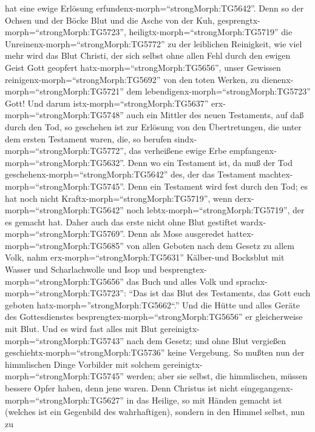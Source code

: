 hat eine ewige Erlösung erfundenx-morph=``strongMorph:TG5642''.
 Denn so der Ochsen und der Böcke Blut und die Asche von
der Kuh, gesprengtx-morph=``strongMorph:TG5723'',
heiligtx-morph=``strongMorph:TG5719'' die
Unreinenx-morph=``strongMorph:TG5772'' zu der leiblichen Reinigkeit,
 wie viel mehr wird das Blut Christi, der sich selbst ohne
allen Fehl durch den ewigen Geist Gott geopfert
hatx-morph=``strongMorph:TG5656'', unser Gewissen
reinigenx-morph=``strongMorph:TG5692'' von den toten Werken, zu
dienenx-morph=``strongMorph:TG5721'' dem
lebendigenx-morph=``strongMorph:TG5723'' Gott!  Und darum
istx-morph=``strongMorph:TG5637'' erx-morph=``strongMorph:TG5748'' auch
ein Mittler des neuen Testaments, auf daß durch den Tod, so geschehen
ist zur Erlösung von den Übertretungen, die unter dem ersten Testament
waren, die, so berufen sindx-morph=``strongMorph:TG5772'', das
verheißene ewige Erbe empfangenx-morph=``strongMorph:TG5632''.
 Denn wo ein Testament ist, da muß der Tod
geschehenx-morph=``strongMorph:TG5642'' des, der das Testament
machtex-morph=``strongMorph:TG5745''.  Denn ein Testament
wird fest durch den Tod; es hat noch nicht
Kraftx-morph=``strongMorph:TG5719'', wenn
derx-morph=``strongMorph:TG5642'' noch
lebtx-morph=``strongMorph:TG5719'', der es gemacht hat. 
Daher auch das erste nicht ohne Blut gestiftet
wardx-morph=``strongMorph:TG5769''.  Denn als Mose
ausgeredet hattex-morph=``strongMorph:TG5685'' von allen Geboten nach
dem Gesetz zu allem Volk, nahm erx-morph=``strongMorph:TG5631''
Kälber-und Bocksblut mit Wasser und Scharlachwolle und Isop und
besprengtex-morph=``strongMorph:TG5656'' das Buch und alles Volk
 und sprachx-morph=``strongMorph:TG5723'': ``Das ist das
Blut des Testaments, das Gott euch geboten
hatx-morph=''strongMorph:TG5662``.''  Und die Hütte und
alles Geräte des Gottesdienstes besprengtex-morph=``strongMorph:TG5656''
er gleicherweise mit Blut.  Und es wird fast alles mit Blut
gereinigtx-morph=``strongMorph:TG5743'' nach dem Gesetz; und ohne Blut
vergießen geschiehtx-morph=``strongMorph:TG5736'' keine Vergebung.
 So mußten nun der himmlischen Dinge Vorbilder mit solchem
gereinigtx-morph=``strongMorph:TG5745'' werden; aber sie selbst, die
himmlischen, müssen bessere Opfer haben, denn jene waren. 
Denn Christus ist nicht eingegangenx-morph=``strongMorph:TG5627'' in das
Heilige, so mit Händen gemacht ist (welches ist ein Gegenbild des
wahrhaftigen), sondern in den Himmel selbst, nun zu
